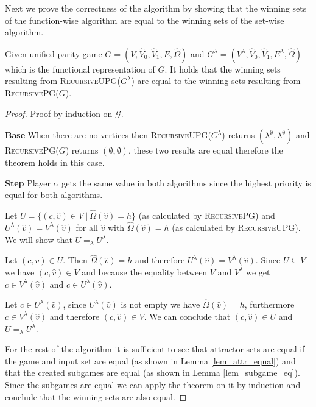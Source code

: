 Next we prove the correctness of the algorithm by showing that the winning sets of the function-wise algorithm are equal to the winning sets of the set-wise algorithm.
\begin{theorem}
	Given unified parity game ${G} = ({V},\hat{V}_0,\hat{V}_1, {E}, \hat{\Omega})$ and $G^\lambda = (V^\lambda, \hat{V}_0, \hat{V}_1, E^\lambda,\hat{\Omega})$ which is the functional representation of $G$. It holds that the winning sets resulting from \textsc{RecursiveUPG(${G}^\lambda$)} are equal to the winning sets resulting from \textsc{RecursivePG(${G}$)}.
	\begin{proof}
		Proof by induction on $\mathcal{G}$.
		
		\textbf{Base} When there are no vertices then \textsc{RecursiveUPG($G^\lambda$)} returns $(\lambda^\emptyset,\lambda^\emptyset)$ and \textsc{RecursivePG($G$)} returns $(\emptyset,\emptyset)$, these two results are equal therefore the theorem holds in this case.
		
		\textbf{Step}
		Player $\alpha$ gets the same value in both algorithms since the highest priority is equal for both algorithms.
		
		Let $U = \{(c,\hat{v}) \in V\ |\ \hat{\Omega}(\hat{v}) = h \}$ (as calculated by \textsc{RecursivePG}) and $U^\lambda(\hat{v}) = V^\lambda(\hat{v})$ for all $\hat{v}$ with $\hat{\Omega}(\hat{v}) = h$ (as calculated by \textsc{RecursiveUPG}). We will show that $U =_\lambda U^\lambda$.
		
		Let $(c,\hat{v}) \in U$. Then $\hat{\Omega}(\hat{v}) = h$ and therefore $U^\lambda(\hat{v}) = V^\lambda(\hat{v})$. Since $U \subseteq V$ we have $(c,\hat{v}) \in V$ and because the equality between $V$ and $V^\lambda$ we get $c \in V^\lambda(\hat{v})$ and $c \in U^\lambda(\hat{v})$.
		
		Let $c \in U^\lambda(\hat{v})$, since $U^\lambda(\hat{v})$ is not empty we have $\hat{\Omega}(\hat{v}) = h$, furthermore $c \in V^\lambda(\hat{v})$ and therefore $(c,\hat{v}) \in V$. We can conclude that $(c, \hat{v}) \in U$ and $U =_\lambda U^\lambda$.
		
		For the rest of the algorithm it is sufficient to see that attractor sets are equal if the game and input set are equal (as shown in Lemma \ref{lem_attr_equal}) and that the created subgames are equal (as shown in Lemma \ref{lem_subgame_eq}). Since the subgames are equal we can apply the theorem on it by induction and conclude that the winning sets are also equal.
	\end{proof}
\end{theorem}

